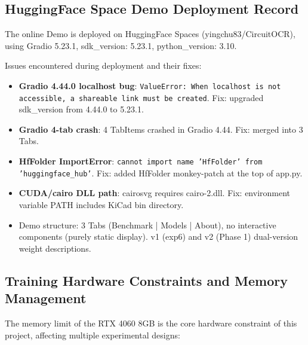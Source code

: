 \subsection{HuggingFace Space Demo Deployment Record}

The online Demo is deployed on HuggingFace Spaces (yingchu83/CircuitOCR), using Gradio 5.23.1, sdk\_version: 5.23.1, python\_version: 3.10.

Issues encountered during deployment and their fixes:

\begin{itemize}[nosep]
    \item \textbf{Gradio 4.44.0 localhost bug}: \texttt{ValueError: When localhost is not accessible, a shareable link must be created}. Fix: upgraded sdk\_version from 4.44.0 to 5.23.1.
    \item \textbf{Gradio 4-tab crash}: 4 TabItems crashed in Gradio 4.44. Fix: merged into 3 Tabs.
    \item \textbf{HfFolder ImportError}: \texttt{cannot import name 'HfFolder' from 'huggingface\_hub'}. Fix: added HfFolder monkey-patch at the top of app.py.
    \item \textbf{CUDA/cairo DLL path}: cairosvg requires cairo-2.dll. Fix: environment variable PATH includes KiCad bin directory.
    \item Demo structure: 3 Tabs (Benchmark | Models | About), no interactive components (purely static display). v1 (exp6) and v2 (Phase 1) dual-version weight descriptions.
\end{itemize}

\subsection{Training Hardware Constraints and Memory Management}

The memory limit of the RTX 4060 8GB is the core hardware constraint of this project, affecting multiple experimental designs:

